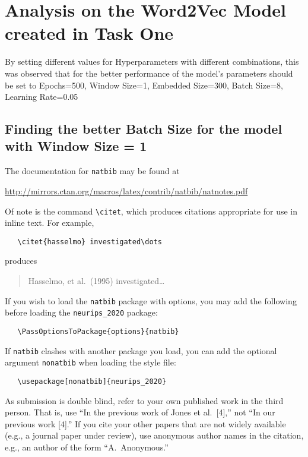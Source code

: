 \documentclass{article}
\begin{document}
\section{Analysis on the Word2Vec Model created in Task One}
\label{others}

By setting different values for Hyperparameters with different combinations, this was observed that for the better performance of the model's parameters should be set to Epochs=500, Window Size=1, Embedded Size=300, Batch Size=8, Learning Rate=0.05


\subsection{Finding the better Batch Size for the model with Window Size = 1}



The documentation for \verb+natbib+ may be found at
\begin{center}
  \url{http://mirrors.ctan.org/macros/latex/contrib/natbib/natnotes.pdf}
\end{center}
Of note is the command \verb+\citet+, which produces citations appropriate for
use in inline text.  For example,
\begin{verbatim}
   \citet{hasselmo} investigated\dots
\end{verbatim}
produces
\begin{quote}
  Hasselmo, et al.\ (1995) investigated\dots
\end{quote}

If you wish to load the \verb+natbib+ package with options, you may add the
following before loading the \verb+neurips_2020+ package:
\begin{verbatim}
   \PassOptionsToPackage{options}{natbib}
\end{verbatim}

If \verb+natbib+ clashes with another package you load, you can add the optional
argument \verb+nonatbib+ when loading the style file:
\begin{verbatim}
   \usepackage[nonatbib]{neurips_2020}
\end{verbatim}

As submission is double blind, refer to your own published work in the third
person. That is, use ``In the previous work of Jones et al.\ [4],'' not ``In our
previous work [4].'' If you cite your other papers that are not widely available
(e.g., a journal paper under review), use anonymous author names in the
citation, e.g., an author of the form ``A.\ Anonymous.''
\end{document}
